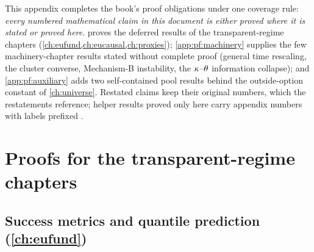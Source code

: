 
This appendix completes the book's proof obligations under one coverage rule: \emph{every numbered
mathematical claim in this document is either proved where it is stated or proved here}.
 proves the deferred results of the transparent-regime chapters
(\cref{ch:eufund,ch:eucausal,ch:proxies}); \cref{app:pf:machinery} supplies the few machinery-chapter
results stated without complete proof (general time rescaling, the cluster converse, Mechanism-B
instability, the $\kappa$--$\theta$ information collapse); and \cref{app:pf:auxiliary} adds two
self-contained pool results behind the outside-option constant of \cref{ch:universe}. Restated claims
keep their original numbers, which the restatements reference; helper results proved only here carry
appendix numbers with labels prefixed .

\section{Proofs for the transparent-regime chapters}
\label{app:pf:transparent}
\subsection{Success metrics and quantile prediction (\cref{ch:eufund})}
